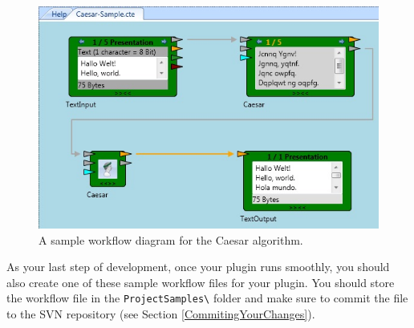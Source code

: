 \begin{figure}[h]
	\centering
		\includegraphics{figures/sample.jpg}
	\caption{A sample workflow diagram for the Caesar algorithm.}
	\label{fig:sample}
\end{figure}

As your last step of development, once your plugin runs smoothly, you should also create one of these sample workflow files for your plugin. You should store the workflow file in the \texttt{ProjectSamples\textbackslash} folder and make sure to commit the file to the SVN repository (see Section \ref{CommitingYourChanges}).
